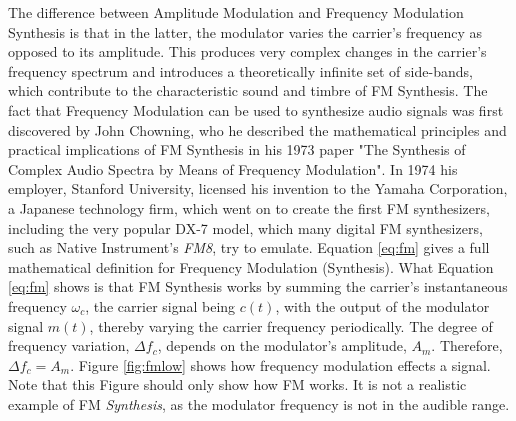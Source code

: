\documentclass[12pt,twoside]{report}
\begin{document}
The difference between Amplitude Modulation and Frequency Modulation Synthesis is that in the latter, the modulator varies the carrier's frequency as opposed to its amplitude. This produces very complex changes in the carrier's frequency spectrum and introduces a theoretically infinite set of side-bands, which contribute to the characteristic sound and timbre of FM Synthesis. The fact that Frequency Modulation can be used to synthesize audio signals was first discovered by John Chowning, who he described the mathematical principles and practical implications of FM Synthesis in his 1973 paper "The Synthesis of Complex Audio Spectra by Means of Frequency Modulation". In 1974 his employer, Stanford University, licensed his invention to the Yamaha Corporation, a Japanese technology firm, which went on to create the first FM synthesizers, including the very popular DX-7 model, which many digital FM synthesizers, such as Native Instrument's \emph{FM8}, try to emulate. Equation \ref{eq:fm} gives a full mathematical definition for Frequency Modulation (Synthesis). What Equation \ref{eq:fm} shows is that FM Synthesis works by summing the carrier's instantaneous frequency $\omega_{c}$, the carrier signal being $c(t)$, with the output of the modulator signal $m(t)$, thereby varying the carrier frequency periodically. The degree of frequency variation, $\Delta f_{c}$, depends on the modulator's amplitude, $A_{m}$. Therefore, $\Delta f_{c} = A_{m}$. Figure \ref{fig:fmlow} shows how frequency modulation effects a signal. Note that this Figure should only show how FM works. It is not a realistic example of FM \emph{Synthesis}, as the modulator frequency is not in the audible range.

\pagebreak
\end{document}
